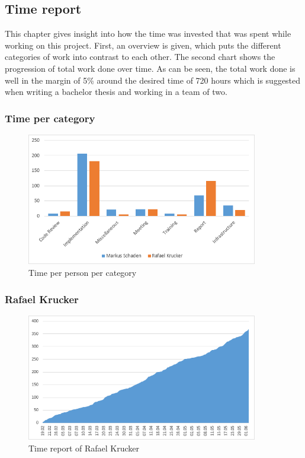 \clearpage
\subsection{Time report}
This chapter gives insight into how the time was invested that was spent while working on this project. First, an overview is given, which puts the different categories of work into contrast to each other. The second chart shows the progression of total work done over time. As can be seen, the total work done is well in the margin of 5\% around the desired time of 720 hours which is suggested when writing a bachelor thesis and working in a team of two. 
\subsubsection{Time per category}
\begin{figure}[H]
	\centering
	\includegraphics[width=0.9\textwidth]{img/timereport_epics}
	\caption{Time per person per category}
	\label{fig:timereport_epics}
\end{figure}

\subsubsection{Rafael Krucker}
\begin{figure}[H]
	\centering
	\includegraphics[width=0.9\textwidth]{img/timereport_rk}
	\caption{Time report of Rafael Krucker}
	\label{fig:timereport_rafael_krucker}
\end{figure}

